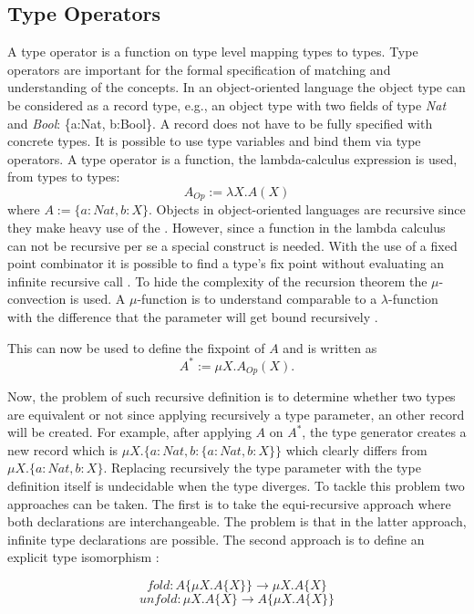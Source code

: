 \subsection{Type Operators}
 A type operator is a function on type level mapping types to
types. Type operators are important for the formal specification of
matching and understanding of the concepts. In an object-oriented language
the object type can be considered as a record type, e.g., an object type
with two fields of type \emph{Nat} and \emph{Bool}: \{a:Nat, b:Bool\}.
A record does not have to be fully specified with concrete types. It
is possible to use type variables and bind them via type operators.
A type operator is a function, the lambda-calculus expression is used,
from types to types: \[A_{Op} := \lambda X.A(X)
\] where $A := \{a:Nat, b:X\}$. Objects in object-oriented languages
are recursive since they make heavy use of the \mytype. However,
since a function in the lambda calculus can not be recursive
per se a special construct is needed. With the use of a fixed
point combinator it is possible to find a type's fix point without
evaluating an infinite recursive call \cite{gabriel_why_1988}. To
hide the complexity of the recursion theorem the $\mu$-convection is
used. A $\mu$-function is to understand comparable to a $\lambda$-function
with the difference that the parameter will get bound recursively
\cite{pierce_types_2002,simons_theory_2002-3}.

This can now be used to define the fixpoint of $A$ and is written as \[A^*
:= \mu X.A_{Op}(X).\]

Now, the problem of such recursive definition is to determine whether two
types are equivalent or not since applying recursively a type parameter,
an other record will be created. For example, after applying $A$ on
$A^*$, the type generator creates a new record which is $\mu X.\{a:Nat,
b:\{a:Nat, b:X\}\}$ which clearly differs from $\mu X.\{a:Nat, b:X\}$.
Replacing recursively the type parameter with the type definition
itself is undecidable when the type diverges. To tackle this problem
two approaches can be taken. The first is to take the equi-recursive
approach where both declarations are interchangeable. The problem is
that in the latter approach, infinite type declarations are possible.
The second approach is to define an explicit type isomorphism
\cite{abadi_subtyping_1996}:

\begin{defn}
	\label{def:foldUnfold}
	\[fold : A\{\mu X.A\{X\}\} \rightarrow \mu X.A\{X\}\]
	\[unfold : \mu X.A\{X\} \rightarrow A\{\mu X.A\{X\}\}\]
\end{defn}

